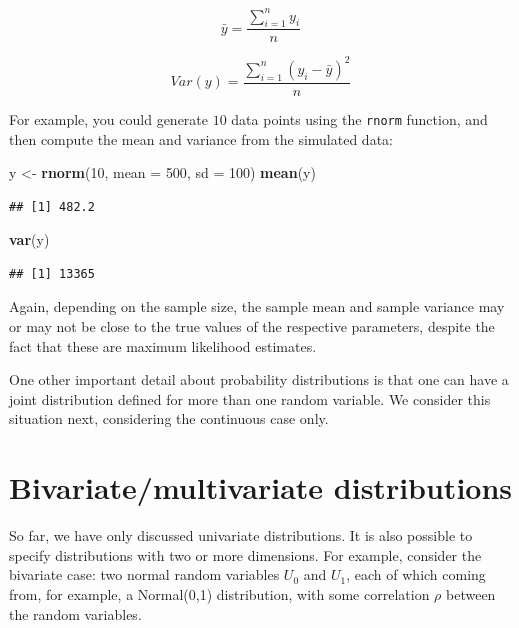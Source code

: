 \documentclass[12pt,]{krantz}
\newenvironment{Shaded}{\begin{snugshade}}{\end{snugshade}}
\newcommand{\DataTypeTok}[1]{\textcolor[rgb]{0.13,0.29,0.53}{#1}}
\newcommand{\DecValTok}[1]{\textcolor[rgb]{0.00,0.00,0.81}{#1}}
\newcommand{\KeywordTok}[1]{\textcolor[rgb]{0.13,0.29,0.53}{\textbf{#1}}}
\newcommand{\NormalTok}[1]{#1}
\newcommand{\StringTok}[1]{\textcolor[rgb]{0.31,0.60,0.02}{#1}}
\begin{document}
\begin{equation}
\bar{y} =  \frac{\sum_{i=1}^n y_i}{n} 
\end{equation}

\begin{equation}
Var(y) = \frac{\sum_{i=1}^n (y_i-
\bar{y})^2}{n}
\end{equation}

For example, you could generate \(10\) data points using the \texttt{rnorm} function, and then compute the mean and variance from the simulated data:

\begin{Shaded}
\begin{Highlighting}[]
\NormalTok{y <-}\StringTok{ }\KeywordTok{rnorm}\NormalTok{(}\DecValTok{10}\NormalTok{, }\DataTypeTok{mean =} \DecValTok{500}\NormalTok{, }\DataTypeTok{sd =} \DecValTok{100}\NormalTok{)}
\KeywordTok{mean}\NormalTok{(y)}
\end{Highlighting}
\end{Shaded}

\begin{verbatim}
## [1] 482.2
\end{verbatim}

\begin{Shaded}
\begin{Highlighting}[]
\KeywordTok{var}\NormalTok{(y)}
\end{Highlighting}
\end{Shaded}

\begin{verbatim}
## [1] 13365
\end{verbatim}

Again, depending on the sample size, the sample mean and sample variance may or may not be close to the true values of the respective parameters, despite the fact that these are maximum likelihood estimates.

One other important detail about probability distributions is that one can have a joint distribution defined for more than one random variable. We consider this situation next, considering the continuous case only.

\hypertarget{bivariatemultivariate-distributions}{%
\section{Bivariate/multivariate distributions}\label{bivariatemultivariate-distributions}}

So far, we have only discussed univariate distributions. It is also possible to specify distributions with two or more dimensions. For example, consider the bivariate case:
two normal random variables \(U_0\) and \(U_1\), each of which coming from, for example, a Normal(0,1) distribution, with some correlation \(\rho\) between the random variables.
\end{document}
